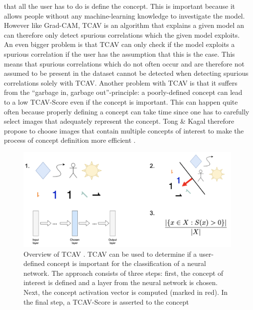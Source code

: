 \documentclass{article}
\begin{document}
that all the user has to do is define the concept. This is important because it allows people without any machine-learning
knowledge to investigate the model. \\
However like Grad-CAM, TCAV is an algorithm that explains a given model an can
therefore only detect spurious correlations which the given model exploits. An even bigger problem is that TCAV can only
check if the model exploits a spurious correlation if the user has the assumption that this is the case.
This means that spurious correlations which do not often occur and are therefore not assumed to be present
in the dataset cannot be detected when detecting spurious correlations solely with TCAV. Another problem with TCAV
is that it suffers from the \enquote{garbage in, garbage out}-principle: a poorly-defined concept can lead to a low
TCAV-Score even if the concept is important. This can happen quite often because properly defining a concept can take time
since one has to carefully select images that adequately represent the concept. Tong \& Kagal therefore propose to choose
images that contain multiple concepts of interest to make the process of concept definition
more efficient \cite{tong2020investigating}.

\begin{figure}
    \centering
    \includegraphics[scale=0.45]{tcav.png}
    \caption{Overview of TCAV \cite{pmlr-v80-kim18d}. TCAV can be used to determine if a user-defined
    concept is important for the classification of a neural network. The approach consists of three steps: first,
    the concept of interest is defined and a layer from the neural network is chosen. Next, the concept activation
    vector is computed (marked in red). In the final step, a TCAV-Score is asserted to the concept}
    \label{fig:tcav}
\end{figure}
\end{document}
